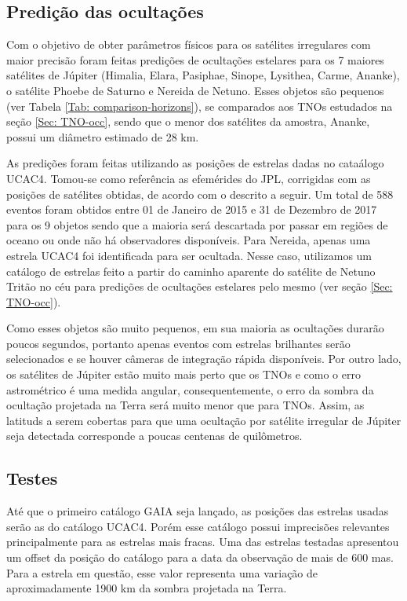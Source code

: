 \documentclass[12pt,a4paper]{monografia}
\begin{document}
\subsection{Predição das ocultações}
\label{Subsec: Irr-predic}

\indent \indent Com o objetivo de obter parâmetros físicos para os satélites irregulares com maior precisão foram feitas predições de ocultações estelares para os 7 maiores satélites de Júpiter (Himalia, Elara, Pasiphae, Sinope, Lysithea, Carme, Ananke), o satélite Phoebe de Saturno e Nereida de Netuno. Esses objetos são pequenos (ver Tabela \ref{Tab: comparison-horizons}), se comparados aos TNOs estudados na seção \ref{Sec: TNO-occ}, sendo que o menor dos satélites da amostra, Ananke, possui um diâmetro estimado de 28 km.

As predições foram feitas utilizando as posições de estrelas dadas no cataálogo UCAC4. Tomou-se como referência as efemérides do JPL, corrigidas com as posições de satélites obtidas, de acordo com o descrito a seguir. Um total de 588 eventos foram obtidos entre 01 de Janeiro de 2015 e 31 de Dezembro de 2017 para os 9 objetos sendo que a maioria será descartada por passar em regiões de oceano ou onde não há observadores disponíveis. Para Nereida, apenas uma estrela UCAC4 foi identificada para ser ocultada. Nesse caso, utilizamos um catálogo de estrelas feito a partir do caminho aparente do satélite de Netuno Tritão no céu para predições de ocultações estelares pelo mesmo (ver seção \ref{Sec: TNO-occ}).

Como esses objetos são muito pequenos, em sua maioria as ocultações durarão poucos segundos, portanto apenas eventos com estrelas brilhantes serão selecionados e se houver câmeras de integração rápida disponíveis. Por outro lado, os satélites de Júpiter estão muito mais perto que os TNOs e como o erro astrométrico é uma medida angular, consequentemente, o erro da sombra da ocultação projetada na Terra será muito menor que para TNOs. Assim, as latituds a serem cobertas para que uma ocultação por satélite irregular de Júpiter seja detectada corresponde a poucas centenas de quilômetros.

\subsection{Testes}
\label{Subsec: Irr-testes}

\indent \indent Até que o primeiro catálogo GAIA seja lançado, as posições das estrelas usadas serão as do catálogo UCAC4. Porém esse catálogo possui imprecisões relevantes principalmente para as estrelas mais fracas. Uma das estrelas testadas apresentou um offset da posição do catálogo para a data da observação de mais de 600 mas. Para a estrela em questão, esse valor representa uma variação de aproximadamente 1900 km da sombra projetada na Terra.
\end{document}
